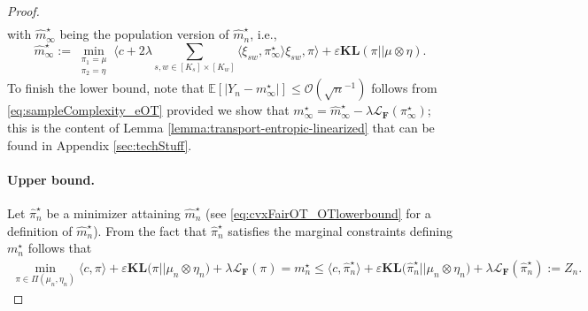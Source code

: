 \documentclass{article}
\newcommand{\kl}{\mathbf{KL}}
\theoremstyle{definition}
\begin{document}
\begin{proof}
\begin{align}
\end{align}
with $\widehat{m}^\star_\infty$ being the population version of $\widehat{m}_n^\star$, i.e.,
\begin{equation*}
\widehat{m}^\star_\infty:=\min_{\substack{\pi_1=\mu\\
    \pi_2=\eta}} \langle c+2 \lambda \sum_{s,w\in [K_s] \times [K_w]} \langle\xi_{sw},\pi_\infty^\star\rangle \xi_{sw},\pi\rangle+\varepsilon \kl(\pi||\mu\otimes \eta).
\end{equation*}
To finish the lower bound,  note that  $\mathbb{E}[|Y_n-m^\star_\infty|]\leq \mathcal{O}(\sqrt{n}^{-1})$ follows from \eqref{eq:sampleComplexity_eOT} provided we show that $m_\infty^\star=\widehat{m}_\infty^ \star- \lambda \mathcal{L}_\mathbf{F}(\pi_\infty^\star)$; this is the content of Lemma \ref{lemma:transport-entropic-linearized} that can be found in Appendix \ref{sec:techStuff}.
\paragraph{Upper bound.}  
Let $\hat{\pi}_n^\star$ be a minimizer attaining $\hat{m}_n^\star$ (see  \eqref{eq:cvxFairOT_OTlowerbound} for a definition of $\hat{m}_n^\star$). From the fact that $\hat{\pi}_n^\star$ satisfies the marginal constraints defining $m^\star_n$ follows that
\begin{align*}
\min_{\pi \in \Pi(\mu_n, \eta_n)} \langle c, \pi \rangle + \varepsilon\kl\big(\pi||\mu_n\otimes\eta_n\big)+ \lambda\mathcal{L}_\mathbf{F}(\pi)=m_n^\star\leq \langle c, \hat\pi_n^\star \rangle + \varepsilon\kl\big(\hat\pi_n^\star||\mu_n\otimes\eta_n\big)+ \lambda\mathcal{L}_\mathbf{F}(\hat\pi_n^\star):=Z_n.
\end{align*}


\end{proof}
\end{document}
